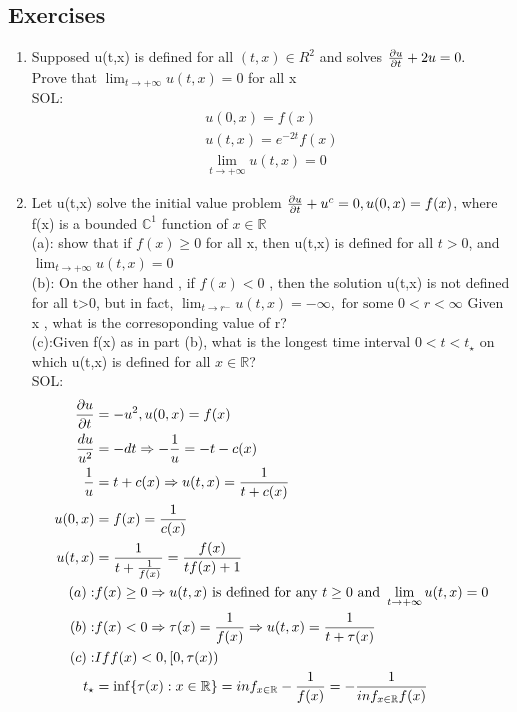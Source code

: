 \subsection{Exercises}
 \begin{enumerate}[label=\circled{\arabic*}] 
 \item Supposed u(t,x) is defined for all $(t,x)\in R^2$ and solves $\pdv{u}{t}+2u=0.$\\
 Prove that $ \lim_{t\rightarrow+\infty}u(t,x)=0  $ for all x \\
 SOL:
 \begin{align*}{}{}
 u(0,x)=f(x)\\
 u(t,x)=e^{-2t}f(x)\\
 \lim_{t\rightarrow+\infty}u(t,x)=0
 \end{align*}
 \item Let u(t,x) solve the initial value problem $\pdv{u}{t}+u^c=0,u(0,x)=f(x)  $, where f(x) is a bounded $ \mathbb{C}^1 $ function of $ x\in\mathbb{R} $ \\
 (a): show that if $f(x)\geq 0$ for all x, then u(t,x) is defined for all $ t>0 $, and $ \lim_{t\rightarrow+\infty}u(t,x)=0 $\\
 (b): On the other hand , if $ f(x)<0 $ , then the solution u(t,x) is not defined for all t>0, but in fact, $ \lim_{t\rightarrow r^{-}}u(t,x)=-\infty,\text{ for some }0<r<\infty $
 Given x , what is the corresoponding value of r?\\
 (c):Given f(x) as in part (b), what is the longest time interval $ 0<t<t_\star $ on which u(t,x) is defined for all $ x\in \mathbb{R} $?
\\SOL:
\begin{align*}{}{}
\pdv{u}{t}&=-u^2,u(0,x)=f(x)\\
\frac{du}{u^2}&=-dt\Rightarrow -\frac{1}{u}=-t-c(x)\\
\frac{1}{u}&=t+c(x)\Rightarrow u(t,x)=\frac{1}{t+c(x)}\\
u(0,x)&=f(x)=\frac{1}{c(x)}\\
u(t,x)&=\frac{1}{t+\frac{1}{f(x)}}=\frac{f(x)}{tf(x)+1}\\
(a):&f(x)\geq 0\Rightarrow u(t,x) \text{ is defined for any }t\geq0 \text{ and } \lim_{t\rightarrow+\infty}u(t,x)=0\\
(b):&f(x)<0\Rightarrow \tau(x)=\frac{1}{f(x)} \Rightarrow u(t,x)=\frac{1}{t+\tau(x)}\\ 
(c): &If f(x)<0,[0,\tau(x))\\
t_\star&=\inf\{\tau(x):x\in \mathbb{R}\}=inf_{x\in \mathbb{R}}-\frac{1}{f(x)}=-\frac{1}{inf_{x\in \mathbb{R}}f(x)}\\

\end{align*}
\end{enumerate}
